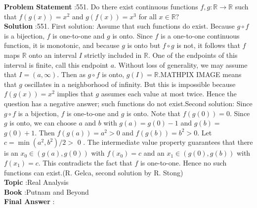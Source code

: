 \documentclass[10pt]{article}
\begin{document}
\textbf{Problem Statement} :551. Do there exist continuous functions $f, g: \mathbb{R} \rightarrow \mathbb{R}$ such that $f(g(x))=x^{2}$ and $g(f(x))=x^{3}$ for all $x \in \mathbb{R} ?$\\
\textbf{Solution} :551. First solution: Assume that such functions do exist. Because $g \circ f$ is a bijection, $f$ is one-to-one and $g$ is onto. Since $f$ is a one-to-one continuous function, it is monotonic, and because $g$ is onto but $f \circ g$ is not, it follows that $f$ maps $\mathbb{R}$ onto an interval $I$ strictly included in $\mathbb{R}$. One of the endpoints of this interval is finite, call this endpoint $a$. Without loss of generality, we may assume that $I=(a, \infty)$. Then as $g \circ f$ is onto, $g(I)=\mathbb{R}$.MATHPIX IMAGE
means that $g$ oscillates in a neighborhood of infinity. But this is impossible because $f(g(x))=x^{2}$ implies that $g$ assumes each value at most twice. Hence the question has a negative answer; such functions do not exist.Second solution: Since $g \circ f$ is a bijection, $f$ is one-to-one and $g$ is onto. Note that $f(g(0))=0$. Since $g$ is onto, we can choose $a$ and $b$ with $g(a)=g(0)-1$ and $g(b)=$ $g(0)+1$. Then $f(g(a))=a^{2}>0$ and $f(g(b))=b^{2}>0$. Let $c=\min \left(a^{2}, b^{2}\right) / 2>$ 0 . The intermediate value property guarantees that there is an $x_{0} \in(g(a), g(0))$ with $f\left(x_{0}\right)=c$ and an $x_{1} \in(g(0), g(b))$ with $f\left(x_{1}\right)=c$. This contradicts the fact that $f$ is one-to-one. Hence no such functions can exist.(R. Gelca, second solution by R. Stong)\\
\textbf{Topic} :Real Analysis\\
\textbf{Book} :Putnam and Beyond\\
\textbf{Final Answer} :\\
\end{document}
